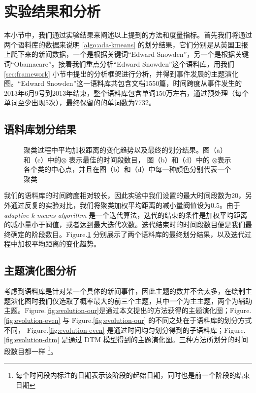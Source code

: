 \section{实验结果和分析}
本小节中，我们通过实验结果来阐述以上提到的方法和度量指标。首先我们将通过两个语料库的数据来说明 \ref{algo:ada-kmeans} 的划分结果，它们分别是从英国卫报上爬下来的新闻数据，一个是根据关键词“Edward Snowden”，另一个是根据关键词“Obamacare”。接着我们重点分析“Edward Snowden”这个语料库，用我们 \ref{sec:framework} 小节中提出的分析框架进行分析，并得到事件发展的主题演化图。“Edward Snowden”这一语料库共包含文档1550篇，时间跨度从事件发生的2013年6月9号到2013年结束，整个语料库包含单词150万左右，通过预处理（每个单词至少出现5次），最终保留的的单词数为7732。
\subsection{语料库划分结果}
\label{sec:ada-kmeans-result}
\begin{figure}[!htb]
	\centering
	\caption{聚类过程中平均加权距离的变化趋势以及最终的划分结果。图（a）和（c）中的$\otimes$ 表示最佳的时间段数目， 图（b）和（d）中的 $\otimes$表示各个类的中心点，并且在图（b）和（d）中每一种颜色分别代表一个聚类}
	\label{fig:cluster}
\end{figure}
我们的语料库的时间跨度相对较长，因此实验中我们设置的最大时间段数为20，另外通过反复的实验对比，我们将聚类加权平均距离的减小量阀值设为0.5。由于 \emph{adaptive k-means algorithm} 是一个迭代算法，迭代的结束的条件是加权平均距离的减小量小于阀值，或者达到最大迭代次数。迭代结束时的时间段数目便是我们最终确定的阶段数目。Figure.\ref{fig:cluster} 分别展示了两个语料库的最终划分结果，以及迭代过程中加权平均距离的变化趋势。

\subsection{主题演化图分析}
\label{sec:evolution-map}
考虑到语料库是针对某一个具体的新闻事件，因此主题的数并不会太多，在绘制主题演化图时我们仅选取了概率最大的前三个主题，其中一个为主主题，两个为辅助主题。Figure.\ref{fig:evolution-our}是通过本文提出的方法获得的主题演化图；Figure.\ref{fig:evolution-even} 与 Figure.\ref{fig:evolution-our} 的不同之处在于语料库的划分方式不同， Figure.\ref{fig:evolution-even}  是通过时间均匀划分得到的子语料库；Figure.\ref{fig:evolution-dtm} 是通过 DTM 模型得到的主题演化图。三种方法所划分的时间段数目都一样 \footnote{每个时间段内标注的日期表示该阶段的起始日期，同时也是前一个阶段的结束日期}。

